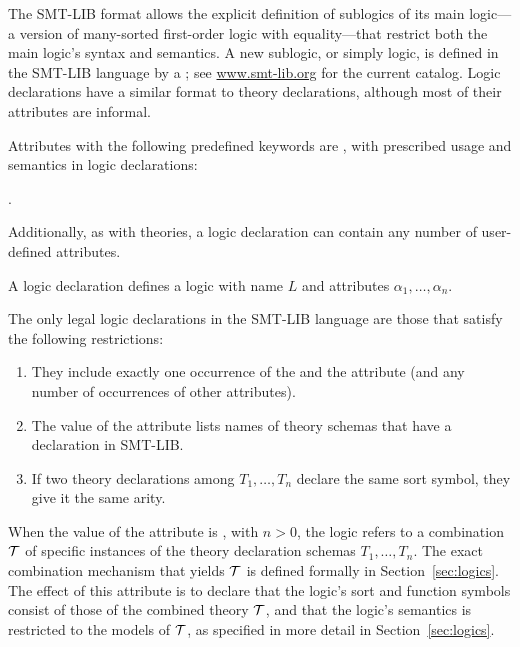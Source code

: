 The SMT-LIB format allows the explicit definition of
sublogics of its main logic--- a version of many-sorted first-order logic with equality---that 
restrict both the main logic's syntax and semantics.
A new sublogic, or simply logic, is defined in the SMT-LIB language by 
a ; see \href{http://www.smt-lib.org}{www.smt-lib.org} for the current catalog.
Logic declarations have a similar format to theory declarations,
although most of their attributes are informal.

Attributes with the following predefined keywords are 
, with prescribed usage and semantics 
in logic declarations:
\begin{center}
\qquad
{}\qquad
{}\qquad
{}\qquad
{} .
\end{center}
Additionally, 
as with theories, a logic declaration can contain any number of user-defined attributes.
\bigskip

\cLogics
\bigskip

A logic declaration 
defines a logic with name $L$ and attributes $\alpha_1, \ldots, \alpha_n$.

\begin{constraint}
The only legal logic declarations in the SMT-LIB language are those 
that satisfy the following restrictions:

\begin{enumerate}
\item
They include exactly one occurrence of the  and 
the  attribute
(and any number of occurrences of other attributes).

\item
The value  of the  attribute lists
names of theory schemas that have a declaration in SMT-LIB.

\item
If two theory declarations among $T_1, \ldots, T_n$ declare 
the same sort symbol, they give it the same arity.
\end{enumerate}
\end{constraint}


When the value of the  attribute is ,
with $n > 0$,
the logic refers to a combination $\mathcal{T}$ of specific instances of 
the theory declaration schemas $T_1, \ldots, T_n$.
The exact combination mechanism that yields $\mathcal{T}$ is defined formally in 
Section~\ref{sec:logics}.
The effect of this attribute is to declare that 
the logic's sort and function symbols consist of those of 
the combined theory $\mathcal{T}$,
and that
the logic's semantics is restricted to the models of $\mathcal{T}$,
as specified in more detail in Section~\ref{sec:logics}.

